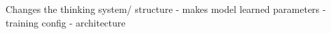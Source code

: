 \documentclass[a4paper]{standalone}
\title{}
\begin{document}
    \maketitle
    Changes the thinking system/ structure
    - makes model learned parameters
    - training config
    - architecture
\end{document}
